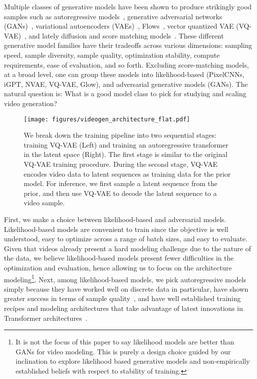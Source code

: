 \documentclass{article}
\begin{document}
Multiple classes of generative models have been shown to produce strikingly good samples such as autoregressive models~\citep{oord2016pixel, oord2016conditional, parmar2018image, menick2018generating, radford2019language, chen2020generative}, generative adversarial networks (GANs)~\citep{goodfellow2014generative, radford2015unsupervised}, variational autoencoders (VAEs)~\citep{kingma2013auto, kingma2016iaf, vahdat2020nvae, child2020very}, Flows~\citep{dinh2014nice, dinh2016density, kingma2018glow, ho2019flow++}, vector quantized VAE (VQ-VAE)~\citep{van2017neural, razavi2019generating, ramesh2021zero}, and lately diffusion and score matching models~\citep{sohl2015deep, song2019generative, ho2020denoising}. These different generative model families have their tradeoffs across various dimensions: sampling speed, sample diversity, sample quality, optimization stability, compute requirements, ease of evaluation, and so forth. Excluding score-matching models, at a broad level, one can group these models into likelihood-based (PixelCNNs, iGPT, NVAE, VQ-VAE, Glow), and adversarial generative models (GANs). The natural question is: What is a good model class to pick for studying and scaling video generation?

\begin{figure*}[!ht]
    \centering
    \texttt{[image: figures/videogen\_architecture\_flat.pdf]}
    \caption{We break down the training pipeline into two sequential stages: training VQ-VAE (Left) and training an autoregressive transformer in the latent space (Right). The first stage is similar to the original VQ-VAE training procedure. During the second stage, VQ-VAE encodes video data to latent sequences as training data for the prior model. For inference, we first sample a latent sequence from the prior, and then use VQ-VAE to decode the latent sequence to a video sample. }
    \label{fig:videogen_architecture}
\end{figure*}

First, we make a choice between likelihood-based and adversarial models. Likelihood-based models are convenient to train since the objective is well understood, easy to optimize across a range of batch sizes, and easy to evaluate. Given that videos already present a hard modeling challenge due to the nature of the data, we believe likelihood-based models present fewer difficulties in the optimization and evaluation, hence allowing us to focus on the architecture modeling\footnote{It is not the focus of this paper to say likelihood models are better than GANs for video modeling. This is purely a design choice guided by our inclination to explore likelihood based generative models and non-empirically established beliefs with respect to stability of training.}. Next, among likelihood-based models, we pick autoregressive models simply because they have worked well on discrete data in particular, have shown greater success in terms of sample quality~\cite{ramesh2021zero}, and have well established training recipes and modeling architectures that take advantage of latest innovations in Transformer architectures~\cite{vaswani2017attention, child2019generating, ho2019axial}.
\end{document}
